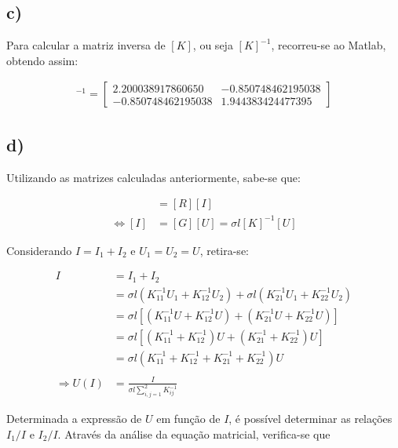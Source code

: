 \documentclass[11pt, a4paper, titlepage, portuguese]{article}
\newcommand{\eq}{\Leftrightarrow} %
\begin{document}
	\subsection{c)}

		\par
		Para calcular a matriz inversa de $[K]$, ou seja $[K]^{-1}$, recorreu-se ao Matlab, obtendo assim:

		\begin{align*}
			[K]^{-1} =
			\begin{bmatrix}
				2.200038917860650  & -0.850748462195038 \\
  				-0.850748462195038 & 1.944383424477395
			\end{bmatrix}
		\end{align*}

	\subsection{d)}

		\par
		Utilizando as matrizes calculadas anteriormente, sabe-se que:

		\begin{align*}
				[U] &= [R][I] \\
			\eq [I] &= [G][U] = \sigma l [K]^{-1}[U]
		\end{align*}

		\par
		Considerando $I = I_1 + I_2$ e $U_1 = U_2 = U$, retira-se:

		\begin{align*}
			I &= I_1 + I_2 \\
			&= \sigma l \left(K^{-1}_{11}U_1 + K^{-1}_{12}U_2\right) + \sigma l \left(K^{-1}_{21}U_1 + K^{-1}_{22}U_2\right)  \\
			&= \sigma l \left[ \left(K^{-1}_{11}U + K^{-1}_{12}U\right) + \left(K^{-1}_{21}U + K^{-1}_{22}U\right) \right] \\
			&= \sigma l \left[ \left(K^{-1}_{11} + K^{-1}_{12}\right)U + \left(K^{-1}_{21} + K^{-1}_{22}\right)U \right] \\
			&= \sigma l \left( K^{-1}_{11} + K^{-1}_{12} + K^{-1}_{21} + K^{-1}_{22} \right) U\\ \\
			\Rightarrow U(I) &= \frac{I}{\sigma l \sum\limits_{i,j=1}^{2} K^{-1}_{ij}}
		\end{align*}

		\par
		Determinada a expressão de $U$ em função de $I$, é possível determinar as relações $I_1/I$ e $I_2/I$. Através da análise da equação matricial, verifica-se que
\end{document}
